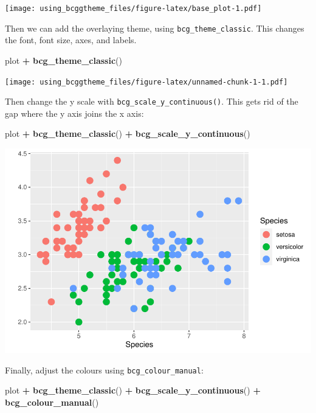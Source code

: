 \documentclass[
]{article}
\newenvironment{Shaded}{\begin{snugshade}}{\end{snugshade}}
\newcommand{\KeywordTok}[1]{\textcolor[rgb]{0.13,0.29,0.53}{\textbf{#1}}}
\newcommand{\NormalTok}[1]{#1}
\newcommand{\OperatorTok}[1]{\textcolor[rgb]{0.81,0.36,0.00}{\textbf{#1}}}
\newcommand{\StringTok}[1]{\textcolor[rgb]{0.31,0.60,0.02}{#1}}
\begin{document}
\texttt{[image: using\_bcggtheme\_files/figure-latex/base\_plot-1.pdf]}

Then we can add the overlaying theme, using
\texttt{bcg\_theme\_classic}. This changes the font, font size, axes,
and labels.

\begin{Shaded}
\begin{Highlighting}[]
\NormalTok{plot }\OperatorTok{+}
\StringTok{  }\KeywordTok{bcg_theme_classic}\NormalTok{()}
\end{Highlighting}
\end{Shaded}

\texttt{[image: using\_bcggtheme\_files/figure-latex/unnamed-chunk-1-1.pdf]}

Then change the y scale with \texttt{bcg\_scale\_y\_continuous()}. This
gets rid of the gap where the y axis joins the x axis:

\begin{Shaded}
\begin{Highlighting}[]
\NormalTok{plot }\OperatorTok{+}
\StringTok{  }\KeywordTok{bcg_theme_classic}\NormalTok{() }\OperatorTok{+}
\StringTok{  }\KeywordTok{bcg_scale_y_continuous}\NormalTok{()}
\end{Highlighting}
\end{Shaded}

\includegraphics{using_bcggtheme_files/figure-latex/unnamed-chunk-2-1.pdf}

Finally, adjust the colours using \texttt{bcg\_colour\_manual}:

\begin{Shaded}
\begin{Highlighting}[]
\NormalTok{plot }\OperatorTok{+}
\StringTok{  }\KeywordTok{bcg_theme_classic}\NormalTok{() }\OperatorTok{+}
\StringTok{  }\KeywordTok{bcg_scale_y_continuous}\NormalTok{() }\OperatorTok{+}
\StringTok{  }\KeywordTok{bcg_colour_manual}\NormalTok{()}
\end{Highlighting}
\end{Shaded}
\end{document}
